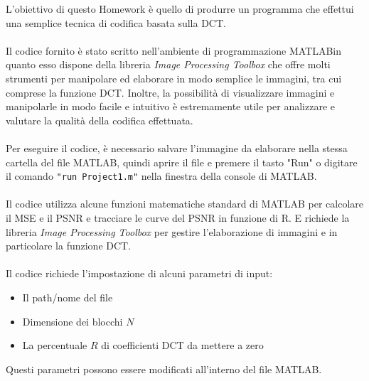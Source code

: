 L'obiettivo di questo Homework è quello di produrre un programma che effettui una semplice tecnica di codifica basata sulla DCT.\\\\
Il codice fornito è stato scritto nell'ambiente di programmazione MATLAB\Rcerchio in quanto esso dispone della libreria \textit{Image Processing Toolbox} che offre molti strumenti per manipolare ed elaborare in modo semplice le immagini, tra cui comprese la funzione DCT. Inoltre, la possibilità di visualizzare immagini e manipolarle in modo facile e intuitivo è estremamente utile per analizzare e valutare la qualità della codifica effettuata.\\\\
Per eseguire il codice, è necessario salvare l'immagine da elaborare nella stessa cartella del file MATLAB, quindi aprire il file e premere il tasto "Run" o digitare il comando \texttt{"run Project1.m"} nella finestra della console di MATLAB.\\\\
Il codice utilizza alcune funzioni matematiche standard di MATLAB per calcolare il MSE e il PSNR e tracciare le curve del PSNR in funzione di R. E richiede la libreria \textit{Image Processing Toolbox} per gestire l'elaborazione di immagini e in particolare la funzione DCT.\\\\
Il codice richiede l'impostazione di alcuni parametri di input:
\begin{itemize}
    \item Il path/nome del file
    \item Dimensione dei blocchi $N$
    \item La percentuale $R$ di coefficienti DCT da mettere a zero
\end{itemize}
Questi parametri possono essere modificati all'interno del file MATLAB\Rcerchio.
